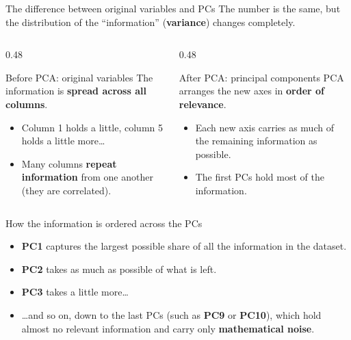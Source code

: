 \documentclass[aspectratio=43,11pt]{beamer}
\begin{document}
\begin{frame}{The difference between original variables and PCs}
The number is the same, but the distribution of the ``information''
(\textbf{variance}) changes completely.

\begin{columns}[T]
\begin{column}{0.48\textwidth}
\begin{block}{Before PCA: original variables}
The information is \textbf{spread across all columns}.
\begin{itemize}
  \item Column 1 holds a little, column 5 holds a little more\ldots
  \item Many columns \textbf{repeat information} from one another
        (they are correlated).
\end{itemize}
\end{block}
\end{column}
\begin{column}{0.48\textwidth}
\begin{exampleblock}{After PCA: principal components}
PCA arranges the new axes in \textbf{order of relevance}.
\begin{itemize}
  \item Each new axis carries as much of the remaining information as possible.
  \item The first PCs hold most of the information.
\end{itemize}
\end{exampleblock}
\end{column}
\end{columns}
\end{frame}

\begin{frame}{How the information is ordered across the PCs}
\begin{itemize}
  \item \textbf{PC1} captures the largest possible share of all the information in the dataset.
  \item \textbf{PC2} takes as much as possible of what is left.
  \item \textbf{PC3} takes a little more\ldots
  \item \ldots and so on, down to the last PCs (such as \textbf{PC9} or \textbf{PC10}),
        which hold almost no relevant information and carry only
        \textbf{mathematical noise}.
\end{itemize}
\end{frame}
\end{document}

